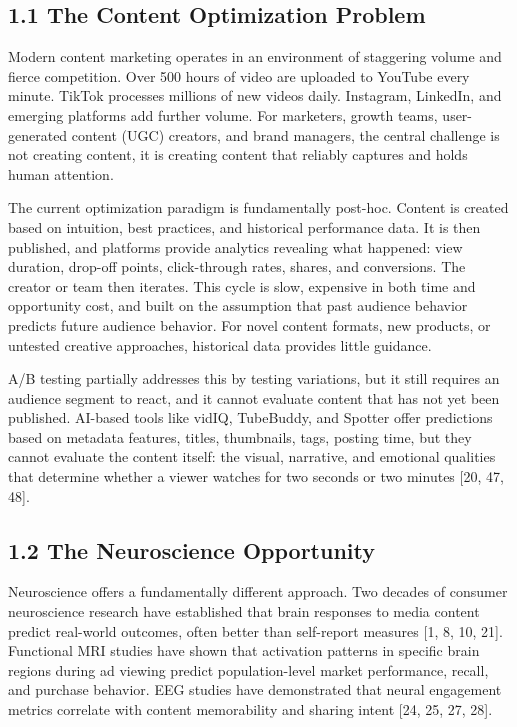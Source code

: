 \documentclass[11pt,letterpaper]{article}
\begin{document}
\subsection{1.1 The Content Optimization Problem}

Modern content marketing operates in an environment of staggering volume and fierce competition. Over 500 hours of video are uploaded to YouTube every minute. TikTok processes millions of new videos daily. Instagram, LinkedIn, and emerging platforms add further volume. For marketers, growth teams, user-generated content (UGC) creators, and brand managers, the central challenge is not creating content, it is creating content that reliably captures and holds human attention.

The current optimization paradigm is fundamentally post-hoc. Content is created based on intuition, best practices, and historical performance data. It is then published, and platforms provide analytics revealing what happened: view duration, drop-off points, click-through rates, shares, and conversions. The creator or team then iterates. This cycle is slow, expensive in both time and opportunity cost, and built on the assumption that past audience behavior predicts future audience behavior. For novel content formats, new products, or untested creative approaches, historical data provides little guidance.

A/B testing partially addresses this by testing variations, but it still requires an audience segment to react, and it cannot evaluate content that has not yet been published. AI-based tools like vidIQ, TubeBuddy, and Spotter offer predictions based on metadata features, titles, thumbnails, tags, posting time, but they cannot evaluate the content itself: the visual, narrative, and emotional qualities that determine whether a viewer watches for two seconds or two minutes [20, 47, 48].

\subsection{1.2 The Neuroscience Opportunity}

Neuroscience offers a fundamentally different approach. Two decades of consumer neuroscience research have established that brain responses to media content predict real-world outcomes, often better than self-report measures [1, 8, 10, 21]. Functional MRI studies have shown that activation patterns in specific brain regions during ad viewing predict population-level market performance, recall, and purchase behavior. EEG studies have demonstrated that neural engagement metrics correlate with content memorability and sharing intent [24, 25, 27, 28].
\end{document}
